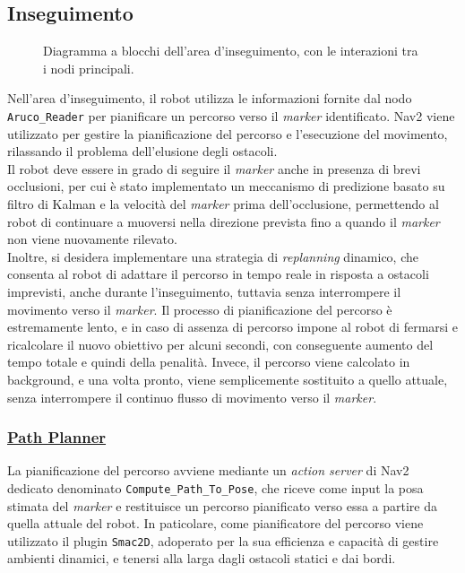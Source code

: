 \documentclass[12pt]{article}
\begin{document}
\subsection{Inseguimento}
\begin{figure}[htbp]
    \centering
  
  \caption{Diagramma a blocchi dell'area d'inseguimento, con le interazioni tra i nodi principali.}
\end{figure}
\noindent
Nell'area d'inseguimento, il robot utilizza le informazioni fornite dal nodo \texttt{Aruco\_Reader} per pianificare un percorso verso il \textit{marker} identificato. Nav2 viene utilizzato per gestire la pianificazione del percorso e l'esecuzione del movimento, rilassando il problema dell'elusione degli ostacoli.
\\[1em]
Il robot deve essere in grado di seguire il \textit{marker} anche in presenza di brevi occlusioni, per cui è stato implementato un meccanismo di predizione basato su filtro di Kalman e la velocità del \textit{marker} prima dell'occlusione, permettendo al robot di continuare a muoversi nella direzione prevista fino a quando il \textit{marker} non viene nuovamente rilevato.
\\[1em]
Inoltre, si desidera implementare una strategia di \textit{replanning} dinamico, che consenta al robot di adattare il percorso in tempo reale in risposta a ostacoli imprevisti, anche durante l'inseguimento, tuttavia senza interrompere il movimento verso il \textit{marker}. Il processo di pianificazione del percorso è estremamente lento, e in caso di assenza di percorso impone al robot di fermarsi e ricalcolare il nuovo obiettivo per alcuni secondi, con conseguente aumento del tempo totale e quindi della penalità. Invece, il percorso viene calcolato in background, e una volta pronto, viene semplicemente sostituito a quello attuale, senza interrompere il continuo flusso di movimento verso il \textit{marker}.
\subsubsection{\href{https://docs.nav2.org/configuration/packages/configuring-smac-planner.html}{Path Planner}}
La pianificazione del percorso avviene mediante un \textit{action server} di Nav2 dedicato denominato \texttt{Compute\_Path\_To\_Pose}, che riceve come input la posa stimata del \textit{marker} e restituisce un percorso pianificato verso essa a partire da quella attuale del robot. In paticolare, come pianificatore del percorso viene utilizzato il plugin \texttt{Smac2D}, adoperato per la sua efficienza e capacità di gestire ambienti dinamici, e tenersi alla larga dagli ostacoli statici e dai bordi.
\end{document}

